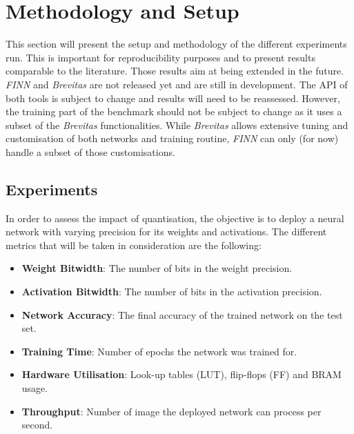 \section{Methodology and Setup}

This section will present the setup and methodology of the different experiments run. This is important for reproducibility purposes and to present results comparable to the literature. Those results aim at being extended in the future. \emph{FINN} and \emph{Brevitas} are not released yet and are still in development. The API of both tools is subject to change and results will need to be reassessed. However, the training part of the benchmark should not be subject to change as it uses a subset of the \emph{Brevitas} functionalities. While \emph{Brevitas} allows extensive tuning and customisation of both networks and training routine, \emph{FINN} can only (for now) handle a subset of those customisations.


\subsection{Experiments}

In order to assess the impact of quantisation, the objective is to deploy a neural network with varying precision for its weights and activations. The different metrics that will be taken in consideration are the following:

\begin{itemize}
  \item \textbf{Weight Bitwidth}: The number of bits in the weight precision.
  \item \textbf{Activation Bitwidth}: The number of bits in the activation precision.
  \item \textbf{Network Accuracy}: The final accuracy of the trained network on the test set.
  \item \textbf{Training Time}: Number of epochs the network was trained for.
  \item \textbf{Hardware Utilisation}: Look-up tables (LUT), flip-flops (FF) and BRAM usage.
  \item \textbf{Throughput}: Number of image the deployed network can process per second.
\end{itemize}

